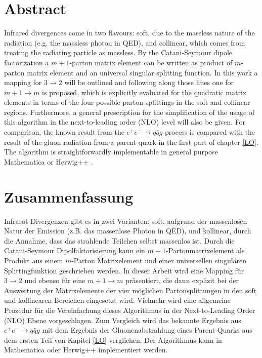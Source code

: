 \thispagestyle{empty}
\section*{\Large \bfseries \centering Abstract}
\vspace{1cm}
Infrared divergences come in two flavours: soft, due to the  massless  nature  of  the  radiation  (e.g.  the  massless photon in QED), and collinear, which comes from treating the radiating particle as massless.
By the Catani-Seymour dipole factorization a $m+1$-parton matrix element can be written as product of $m$-parton matrix element and an universal singular splitting function.  
In this work a mapping for $ 3\rightarrow 2 $ will be outlined and following along those lines one for $ m+1\rightarrow m $ is proposed, which is explicitly evaluated for the quadratic matrix elements in terms of the four possible parton splittings in the soft and collinear regions. Furthermore, a general prescription for the simplification of the usage of this algorithm in the next-to-leading order (NLO) level will also be given.  For comparison, the known result from the $ e^{+}e^{-} \rightarrow q \bar{q} g $ process is compared with the result of the gluon radiation from a parent quark in the first part of chapter \ref{LO}. 
The algorithm is straightforwardly implementable in general purpose \textup{Mathematica} or \textup{Herwig++} \cite{Bahr:2008pv}.

\vspace{3cm}
\section*{\Large \bfseries \centering Zusammenfassung}
\vspace{1cm}
Infrarot-Divergenzen gibt es in zwei Varianten: soft, aufgrund der massenlosen Natur der Emission (z.B. das massenlose Photon in QED), und kollinear, durch die Annahme, dass das strahlende Teilchen selbst massenlos ist.
Durch die Catani-Seymour Dipolfaktorisierung kann ein $m+1$-Partonmatrixelement als Produkt aus einem $m$-Parton Matrixelement und einer universellen singul\"aren Splittingfunktion geschrieben werden.  
In dieser Arbeit wird eine Mapping für $ 3\rightarrow 2 $ und ebenso f\"ur eine $ m+1\rightarrow m $ pr\"asentiert, die dann explizit bei der Auswertung der Matrixelemente der vier möglichen Partonsplittungen in den soft und kollinearen Bereichen eingesetzt wird. Vielmehr wird eine allgemeine Prozedur für die Vereinfachung dieses Algorithmus in der Next-to-Leading Order (NLO) Ebene vorgeschlagen.  Zum Vergleich wird das bekannte Ergebnis aus $ e^{+}e^{-} \rightarrow q \bar{q} g $ mit dem Ergebnis der Gluonenabstrahlung eines Parent-Quarks aus dem ersten Teil von Kapitel \ref{LO} verglichen. 
Der Algorithmus kann in \textup{Mathematica} oder \textup{Herwig++} \cite{Bahr:2008pv} implementiert werden.